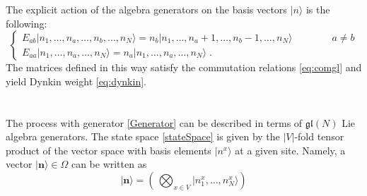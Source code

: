 \documentclass[10pt]{article}
\numberwithin{equation}{section}
\numberwithin{equation}{subsection}
\newcommand{\dt}{\;.}
\newcommand{\twoj}{\nu}
\begin{document}
The explicit action of the algebra generators on the basis  vectors $|n\rangle$ is the following:
\begin{equation}\label{actionE}
	\begin{cases}
		E_{ab}|n_{1},\ldots,n_{a},\ldots,n_{b},\ldots,n_{N}\rangle =n_{b}|n_{1},\ldots,n_{a}+1,\ldots,n_{b}-1,\ldots,n_{N}\rangle\qquad\qquad a\neq b\\[0.1cm]
		E_{aa}|n_{1},\ldots,n_{a},\ldots,n_{N}\rangle = n_{a} |n_{1},\ldots,n_{a},\ldots,n_{N}\rangle\dt
	\end{cases}
\end{equation}  
The matrices defined in this way satisfy the commutation relations \eqref{eq:comgl} and yield Dynkin weight \eqref{eq:dynkin}. \\
\\ \\
The process with generator \eqref{Generator} can be described in terms of $\mathfrak{gl}(N)$ Lie algebra generators. The state space \eqref{stateSpace} is given by the $|V|$-fold tensor product of the vector space with basis elements $|n^x\rangle$ at a given site. Namely,
a vector $|{\bm{n}}\rangle \in \Omega$ can be written as
\begin{equation}
|{\bm{n}}\rangle=\left(\,\bigotimes_{x\in V}	|n_{1}^{x},\ldots,n_{N}^{x}\rangle\right)
\end{equation}
\end{document}
